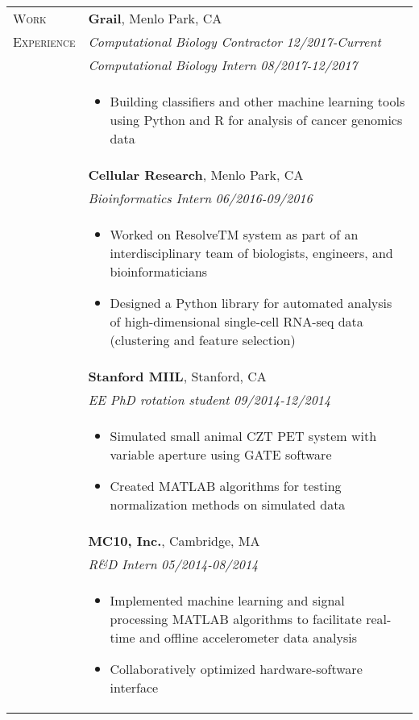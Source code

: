 \documentclass[letterpaper,11pt,oneside]{article}
\begin{document}
\begin{longtable}{@{} p{2.5cm} p{14.8cm}}
     
  \large{\textsc{Work}}  & \textbf{Grail}, Menlo Park, CA \\*
  \large{\textsc{Experience}}  & \textit{Computational Biology Contractor}  \hfill \textit{12/2017-Current} \\* 
  & \textit{Computational Biology Intern}   \hfill \textit{08/2017-12/2017} \\*
& 
\vspace{-7mm}
\begin{itemize}[leftmargin=.5cm]
	\setlength\itemsep{-0.3em}
	\item Building classifiers and other machine learning tools using Python and R for analysis of cancer genomics data
\end{itemize} 
\\

& \textbf{Cellular Research}, Menlo Park, CA \\*
& \textit{Bioinformatics Intern} \hfill \textit{06/2016-09/2016} \\* 
& 
\vspace{-7mm}
\begin{itemize}[leftmargin=.5cm]
	\setlength\itemsep{-0.3em}
	\item Worked on ResolveTM system as part of an interdisciplinary team of biologists, engineers, and bioinformaticians
	\item Designed a Python library for automated analysis of high-dimensional single-cell RNA-seq data (clustering and feature selection)
\end{itemize} 
\\

& \textbf{Stanford MIIL}, Stanford, CA\\
& \textit{EE PhD rotation student} \hfill \textit{09/2014-12/2014}  \\ 
& 
\vspace{-7mm}
\begin{itemize}[leftmargin=.5cm]
	\setlength\itemsep{-0.3em}
	\item Simulated small animal CZT PET system with variable aperture using GATE software
	\item Created MATLAB algorithms for testing normalization methods on simulated data
\end{itemize} 
\\

& \textbf{MC10, Inc.}, Cambridge, MA \\
& \textit{R\&D Intern} \hfill \textit{05/2014-08/2014} \\ 
& 
\vspace{-7mm}
\begin{itemize}[leftmargin=.5cm]
	\setlength\itemsep{-0.3em}
	\item Implemented machine learning and signal processing MATLAB algorithms to facilitate real-time and offline accelerometer data analysis
	\item Collaboratively optimized hardware-software interface
\end{itemize} 
\\


\end{longtable}
\end{document}
